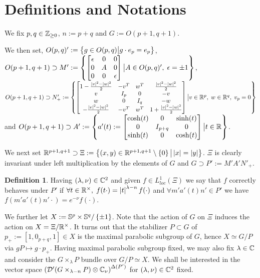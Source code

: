 \documentclass[10pt]{article} %
\title{}
\author{Alex Leontiev}
\newcommand{\D}{\mathcal{D}}
\theoremstyle{definition}
\newtheorem{mydef}{Definition}[section]
\theoremstyle{remark}
\begin{document}
\newcommand{\sone}{$\mybra{\D'(G\times_{\lambda-n} P)\otimes\C_\nu}^{\Delta(P')}$}
\newcommand{\Upp}{\mysetn{(x,y)\in\R^{p,q}}{x\neq0,\;y\neq0}}
\maketitle
\section{Definitions and Notations}
We fix $p,q\in\mathbb{Z}_{\geq0}$, $n:=p+q$ and $G:=O(p+1,q+1)$.

We then set, $O(p,q)':=\left\{ g\in O(p,q) \big|  g\cdot e_p=e_p \right\}$,
$O(p+1,q+1)\supset M':=\left\{ \begin{bmatrix}\epsilon&0&0\\0&A&0\\0&0&\epsilon\end{bmatrix}\big| A\in O(p,q)',\;\epsilon=\pm1\right\}$,\\
$O(p+1,q+1)\supset N_+':=\left\{
\begin{bmatrix}
	1-\frac{ \left| v \right|^2-\left| w \right|^2 }{2}&-v^T&w^T&\frac{ \left| v \right|^2-\left| w \right|^2 }{2}\\
	v&I_{ p }&0&-v\\w&0&I_q&-w\\-\frac{ \left| v \right|^2-\left| w \right|^2 }{2}&-v^T&w^T&1+\frac{ \left| v \right|^2-\left| w \right|^2 }{2}\\
\end{bmatrix}\big| v\in\mathbb{R}^p,\;w\in\mathbb{R}^q,\;v_p=0\right\}$ and
$O(p+1,q+1)\supset A':=\left\{a'(t):= 
	\begin{bmatrix}
		\cosh(t)&0&\sinh(t)\\0&I_{ p+q }&0\\\sinh(t)&0&\cosh(t)
	\end{bmatrix}
\big| t\in\mathbb{R}\right\}$.

We next set $\mathbb{R}^{ p+1,q+1 }\supset\Xi:=\left\{ (x,y)\in\mathbb{R}^{ p+1,q+1 }\setminus \left\{ 0 \right\}\big| \left|x\right|=\left|y\right|\right\}$.
$\Xi$ is clearly invariant under left multiplication by the elements of $G$ and $G\supset P':=M'A'N'_+$.
\begin{mydef}
	Having $(\lambda,\nu)\in\mathbb{C}^2$ and given $f\in L^1_{loc}(\Xi)$ we say that $f$ correctly behaves under $P'$
	if $\forall t\in\mathbb{R}^\times,\;f(t\cdot)=\left|t\right|^{\lambda-n}f(\cdot)$ and 
	$\forall m'a'(t)n'\in P'$
	we have $f(m'a'(t)n'\cdot)=e^{ -\nu }f(\cdot)$.
\end{mydef}

We further let $X:=\mathbb{S}^p\times\mathbb{S}^q/\left\{ \pm1 \right\}$. Note that the action of $G$
on $\Xi$ induces the action on $X=\Xi/\mathbb{R}^\times$. It turns out that the stabilizer $P\subset G$ of $p_+:=[1,0_{p+q},1]\in X$
is the maximal parabolic subgroup of $G$, hence $X\simeq G/P$ via $gP\mapsto g\cdot p_+$. Having maximal parabolic subgroup
fixed, we may also fix $\lambda\in\mathbb{C}$ and consider the $G\times_\lambda P$ bundle over $G/P\simeq X$. We shall be interested
in the vector space $\mybra{\D'(G\times_{\lambda-n} P)\otimes\C_\nu}^{\Delta(P')}$ for $(\lambda,\nu)\in\mathbb{C}^2$ fixed.
\end{document}
